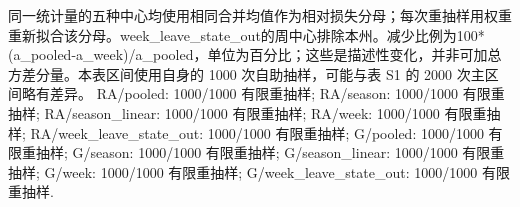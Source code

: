 \begin{table}[htbp]
\begin{tabularx}{\linewidth}
\bottomrule
\end{tabularx}
\par\smallskip
\begin{minipage}{\linewidth}\footnotesize\raggedright
同一统计量的五种中心均使用相同合并均值作为相对损失分母；每次重抽样用权重重新拟合该分母。week\_\allowbreak{}leave\_\allowbreak{}state\_\allowbreak{}out的周中心排除本州。减少比例为100*(a\_\allowbreak{}pooled-a\_\allowbreak{}week)/a\_\allowbreak{}pooled，单位为百分比；这些是描述性变化，并非可加总方差分量。本表区间使用自身的 1000 次自助抽样，可能与表 S1 的 2000 次主区间略有差异。 RA/pooled: 1000/1000 有限重抽样; RA/season: 1000/1000 有限重抽样; RA/season\_\allowbreak{}linear: 1000/1000 有限重抽样; RA/week: 1000/1000 有限重抽样; RA/week\_\allowbreak{}leave\_\allowbreak{}state\_\allowbreak{}out: 1000/1000 有限重抽样; G/pooled: 1000/1000 有限重抽样; G/season: 1000/1000 有限重抽样; G/season\_\allowbreak{}linear: 1000/1000 有限重抽样; G/week: 1000/1000 有限重抽样; G/week\_\allowbreak{}leave\_\allowbreak{}state\_\allowbreak{}out: 1000/1000 有限重抽样.
\end{minipage}
\end{table}
